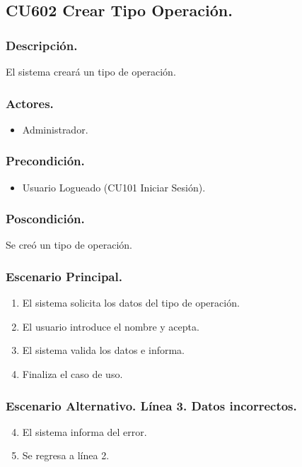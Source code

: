 \subsection{CU602 Crear Tipo Operaci\'{o}n.}
\subsubsection{Descripci\'{o}n.}
El sistema crear\'{a} un tipo de operaci\'{o}n.
\subsubsection{Actores.}
\begin{itemize}
\item Administrador.
\end{itemize}
\subsubsection{Precondici\'{o}n.}
\begin{itemize}
\item Usuario Logueado (CU101 Iniciar Sesi\'{o}n).
\end{itemize}
\subsubsection{Poscondici\'{o}n.}
Se cre\'{o} un tipo de operaci\'{o}n.
\subsubsection{Escenario Principal.}
\begin{enumerate}
\item El sistema solicita los datos del tipo de operaci\'{o}n.
\item El usuario introduce el nombre y acepta.
\item El sistema valida los datos e informa.
\item Finaliza el caso de uso.
\end{enumerate}
\subsubsection{Escenario Alternativo. L\'{i}nea 3. Datos incorrectos.}
\begin{enumerate}
\setcounter{enumi}{3}
\item El sistema informa del error.
\item Se regresa a l\'{i}nea 2.
\end{enumerate}
